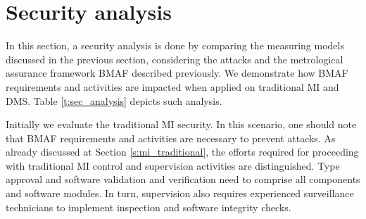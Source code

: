 \documentclass[journal]{IEEEtran}
\begin{document}

\section{Security analysis}
\label{s:sec_analysis}
In this section, a security analysis is done by comparing the measuring models discussed in the previous section, considering the attacks and the metrological assurance framework BMAF described previously. 
We demonstrate how BMAF requirements and activities are impacted when applied on traditional MI and DMS. 
Table \ref{t:sec_analysis} depicts such analysis.

Initially we evaluate the traditional MI security. 
In this scenario, one should note that BMAF requirements and activities are necessary to prevent attacks.
As already discussed at Section \ref{s:mi_traditional}, the efforts required for proceeding with traditional MI control and supervision activities are distinguished.
Type approval and software validation and verification need to comprise all components and software modules.
In turn, supervision also requires experienced surveillance technicians to implement inspection and software integrity checks.
\end{document}
